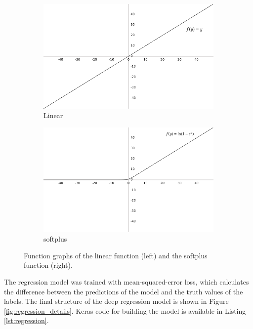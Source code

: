\begin{figure}[h]
    \centering
    \begin{subfigure}{0.4\textwidth}
        \includegraphics[width=\textwidth]{dissertation/figures/linear_function.png}
        \caption{Linear}
    \end{subfigure}
    \begin{subfigure}{0.4\textwidth}
        \includegraphics[width=\textwidth]{dissertation/figures/softplus_function.png}
        \caption{softplus}
    \end{subfigure}
    \caption{Function graphs of the linear function (left) and the softplus function (right).}
    \label{fig:linear_softplus}
\end{figure}

The regression model was trained with mean-squared-error loss, which calculates the difference between the predictions of the model and the truth values of the labels. The final structure of the deep regression model is shown in Figure \ref{fig:regression_details}. Keras code for building the model is available in Listing \ref{lst:regression}. 

